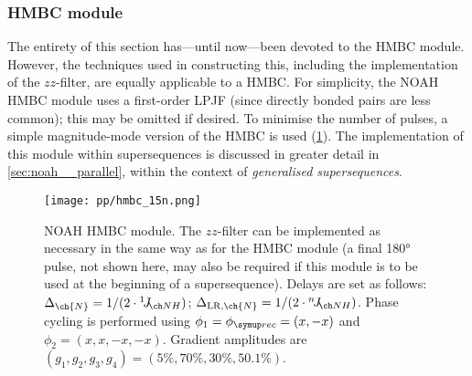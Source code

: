 \subsubsection{\nitrogen{} HMBC module}

The entirety of this section has---until now---been devoted to the \carbon{} HMBC module.
However, the techniques used in constructing this, including the implementation of the $zz$-filter, are equally applicable to a \nitrogen{} HMBC.
For simplicity, the NOAH \nitrogen{} HMBC module uses a first-order LPJF (since directly bonded  pairs are less common); this may be omitted if desired.
To minimise the number of pulses, a simple magnitude-mode version of the HMBC is used (\cref{fig:noah_15n_hmbc}).
The implementation of this module within supersequences is discussed in greater detail in \cref{sec:noah__parallel}, within the context of \textit{generalised supersequences}.

\begin{figure}[htb]
    \centering
    \texttt{[image: pp/hmbc\_15n.png]}%
    \caption[NOAH \nitrogen{} HMBC module]{
        NOAH \nitrogen{} HMBC module.
        The $zz$-filter can be implemented as necessary in the same way as for the \carbon{} HMBC module (a final \proton{} \ang{180} pulse, not shown here, may also be required if this module is to be used at the beginning of a supersequence).
        Delays are set as follows: $\Delta_{\ch{N}} = 1 / (2 \cdot \oneJ{NH})$; $\Delta_{\text{LR},\ch{N}} = 1 / (2 \cdot \nJ{NH})$.
        Phase cycling is performed using $\phi_1 = \phirec = (x, -x)$ and $\phi_2 = (x, x, -x, -x)$.
        Gradient amplitudes are $(g_1, g_2, g_3, g_4) = (5\%, 70\%, 30\%, 50.1\%)$.
    }
    \label{fig:noah_15n_hmbc}
\end{figure}
